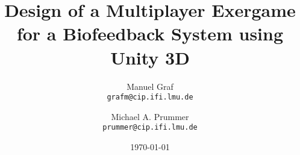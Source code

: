 


\author{ 
Manuel Graf\\
  \texttt{grafm@cip.ifi.lmu.de}
  \and
  Michael A. Prummer\\
  \texttt{prummer@cip.ifi.lmu.de}
}
\title{Design of a Multiplayer Exergame for a Biofeedback System using Unity 3D
}
\date{\today}





\maketitle

\textbf{}

